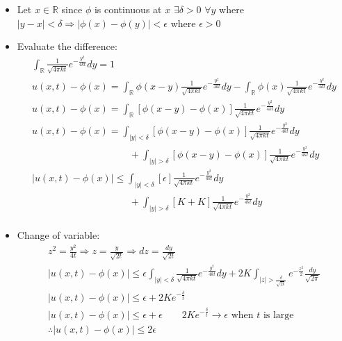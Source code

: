 \documentclass[12pt, a4paper]{article}
\begin{document}
\begin{itemize}
    \item Let $x \in \mathbb{R}$ since $\phi$ is continuous at $x$ $\exists \delta > 0$ $\forall y$ where $|y-x| < \delta \Rightarrow |\phi(x)-\phi(y)|<\epsilon$ where $\epsilon > 0$
    \item Evaluate the difference:
    \begin{gather*}
        \int_{\mathbb{R}} \frac{1}{\sqrt{4\pi kt}}e^{-\frac{y^2}{4kt}}dy = 1\\
        u(x, t) - \phi(x) = \int_{\mathbb{R}} \phi(x-y) \frac{1}{\sqrt{4\pi kt}}e^{-\frac{y^2}{4kt}}dy - \int_{\mathbb{R}} \phi(x) \frac{1}{\sqrt{4\pi kt}}e^{-\frac{y^2}{4kt}}dy\\
        u(x, t) - \phi(x)= \int_{\mathbb{R}} [\phi(x-y) - \phi(x)] \frac{1}{\sqrt{4\pi kt}}e^{-\frac{y^2}{4kt}}dy\\
        u(x, t) - \phi(x)= \int_{|y| < \delta} [\phi(x-y) - \phi(x)] \frac{1}{\sqrt{4\pi kt}}e^{-\frac{y^2}{4kt}}dy \\
        \qquad \qquad \qquad\qquad \qquad + \int_{|y| > \delta} [\phi(x-y) - \phi(x)] \frac{1}{\sqrt{4\pi kt}}e^{-\frac{y^2}{4kt}}dy\\
        |u(x, t) - \phi(x)|\leq \int_{|y| < \delta} [\epsilon] \frac{1}{\sqrt{4\pi kt}}e^{-\frac{y^2}{4kt}}dy \\
        \qquad \qquad \qquad\qquad \qquad + \int_{|y| > \delta} [K + K] \frac{1}{\sqrt{4\pi kt}}e^{-\frac{y^2}{4kt}}dy\\
    \end{gather*}
    \item Change of variable:
    \begin{gather*}
        z^2 = \frac{y^2}{4t} \Rightarrow z = \frac{y}{\sqrt{2t}} \Rightarrow dz = \frac{dy}{\sqrt{2t}}\\
        |u(x, t) - \phi(x)|\leq \epsilon\int_{|y| < \delta} \frac{1}{\sqrt{4\pi kt}}e^{-\frac{y^2}{4kt}}dy + 2K \int_{|z| > \frac{\delta}{\sqrt{2t}}} e^{-\frac{z^2}{2}}\frac{dy}{\sqrt{2\pi}}\\
        |u(x, t) - \phi(x)|\leq \epsilon+ 2Ke^{-\frac{\delta}{t}}\\
        |u(x, t) - \phi(x)|\leq \epsilon+ \epsilon \qquad \text{$2Ke^{-\frac{\delta}{t}} \to \epsilon$ when $t$ is large}\\
        \therefore |u(x, t) - \phi(x)|\leq 2\epsilon
    \end{gather*}
\end{itemize}
\vspace{0.3em}
\end{document}

